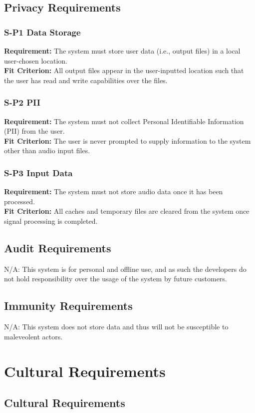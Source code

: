 \documentclass[12pt]{article}
\begin{document}
\subsection{Privacy Requirements}
\subsubsection*{S-P1 Data Storage}
\textbf{Requirement:} The system must store user data (i.e., output files) in a local user-chosen location. \\ 
\textbf{Fit Criterion:} All output files appear in the user-inputted location such that the user has read and write capabilities over the files. 
\subsubsection*{S-P2 PII}
\textbf{Requirement:} The system must not collect Personal Identifiable Information (PII) from the user. \\ 
\textbf{Fit Criterion:} The user is never prompted to supply information to the system other than audio input files. 
\subsubsection*{S-P3 Input Data}
\textbf{Requirement:} The system must not store audio data once it has been processed. \\ 
\textbf{Fit Criterion:} All caches and temporary files are cleared from the system once signal processing is completed.

\subsection{Audit Requirements}
N/A: This system is for personal and offline use, and as such the developers do not hold responsibility over the usage of the system by future customers.
\subsection{Immunity Requirements}
N/A: This system does not store data and thus will not be susceptible to maleveolent actors.


\section{Cultural Requirements}
\subsection{Cultural Requirements}
\end{document}

